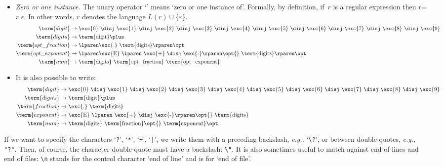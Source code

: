 \begin{itemize}

  \item \emph{Zero or one instance.} The unary operator `\opt{}' means
    `zero or one instance of'. Formally, by definition, if~\(r\) is a
    regular expression then \(r\)\opt = \(r\) \disj \(\epsilon\). In
    other words, \lparen\(r\)\rparen\opt{} denotes the language \(L(r)
    \cup \{\varepsilon\}\).
\begin{align*}
\term{digit} & \rightarrow \text{\exc{0} \disj \exc{1} \disj \exc{2}
  \disj \exc{3} \disj \exc{4} \disj \exc{5} \disj \exc{6} \disj
  \exc{7} \disj \exc{8} \disj \exc{9}}\\
\term{digits} & \rightarrow \text{\term{digit}\plus}\\
\term{opt\_fraction} & \rightarrow \text{\lparen\exc{.}
  \term{digits}\rparen\opt}\\
\term{opt\_exponent} & \rightarrow \text{\lparen\exc{E} \lparen
  \exc{+} \disj \exc{-}\rparen\opt{} \term{digits}\rparen\opt}\\
\term{num} & \rightarrow \text{\term{digits} \term{opt\_fraction}
  \term{opt\_exponent}}
\end{align*}

 \item It is also possible to write:
\begin{align*}
\term{digit} & \rightarrow \text{\exc{0} \disj \exc{1} \disj \exc{2}
  \disj \exc{3} \disj \exc{4} \disj \exc{5} \disj \exc{6} \disj
  \exc{7} \disj \exc{8} \disj \exc{9}}\\
\term{digits} & \rightarrow \text{\term{digit}\plus}\\
\term{fraction} & \rightarrow \text{\exc{.} \term{digits}}\\
\term{exponent} & \rightarrow \text{\exc{E} \lparen \exc{+} \disj
  \exc{-}\rparen\opt{} \term{digits}}\\
\term{num} & \rightarrow \text{\term{digits} \term{fraction}\opt{}
  \term{exponent}\opt}
\end{align*}

\end{itemize}
If we want to specify the characters `\texttt{?}', `\texttt{*}',
`\texttt{+}', `\texttt{|}', we write them with a preceding backslash,
\emph{e.g.,} `\verb+\?+', or between double-quotes, \emph{e.g.,}
\verb+"?"+. Then, of course, the character double-quote must have a
backslash: \verb+\"+. It is also sometimes useful to match against end
of lines and end of files: \verb+\n+ stands for the control character
`end of line' and \term{\$} is for `end of file'.

